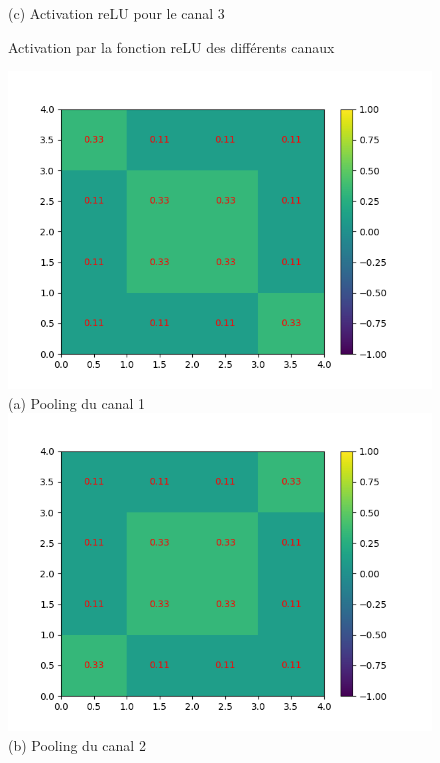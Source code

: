 \begin{figure}[!h]
        \center 
        (c) Activation reLU pour le canal 3
    \endminipage
    \caption{Activation par la fonction reLU des différents canaux}
\end{figure}

\begin{figure}[!h]
        \includegraphics[width=\textwidth]{img/cnn_exemple/square/stride_1_max.png}
        \center 
        (a) Pooling du canal 1
    \endminipage\hfill
        \includegraphics[width=\textwidth]{img/cnn_exemple/square/stride_2_max.png}
        \center 
        (b) Pooling du canal 2
    \endminipage\hfill

\end{figure}
